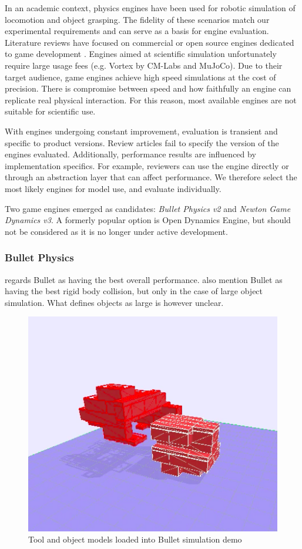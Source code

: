 \documentclass[11]{article}
\begin{document}
In an academic context, physics engines have been used for robotic simulation of locomotion and object grasping.
The fidelity of these scenarios match our experimental requirements and can serve as a basis for engine evaluation. 
Literature reviews have focused on commercial or open source engines dedicated to game development \cite{boeing2007,roennau2013,hummel2012}. 
Engines aimed at scientific simulation unfortunately require large usage fees (e.g. Vortex by CM-Labs and MuJoCo).
Due to their target audience, game engines achieve high speed simulations at the cost of precision. 
There is compromise between speed and how faithfully an engine can replicate real physical interaction.
For this reason, most available engines are not suitable for scientific use. 

With engines undergoing constant improvement, evaluation is transient and specific to product versions. 
Review articles fail to specify the version of the engines evaluated.
Additionally, performance results are influenced by implementation specifics.
For example, reviewers can use the engine directly or through an abstraction layer that can affect performance.  
We therefore select the most likely engines for model use, and evaluate individually. 

Two game engines emerged as candidates: \emph{Bullet Physics v2} and \emph{Newton Game Dynamics v3}.
A formerly popular option is Open Dynamics Engine, but should not be considered as it is no longer under active development. 

\subsubsection{Bullet Physics}
\cite{boeing2007} regards Bullet as having the best overall performance. 
\cite{hummel2012,roennau2013} also mention Bullet as having the best rigid body collision, but only in the case of large object simulation.
What defines objects as large is however unclear. 

\begin{figure}[h]
  \centering
  \includegraphics[width=.5\textwidth]{figures/bullet_demo.png}
  \caption{Tool and object models loaded into Bullet simulation demo}
  \label{fig:bullet_demo}
\end{figure}      
\end{document}
